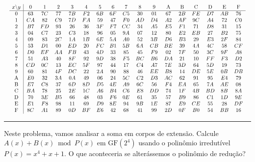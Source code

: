 \documentclass[12pt,a4paper]{article}
\newcommand{\exercicio}[1]{%
    \par\vspace{1.2em}
    \noindent
    {\color{black!55}\rule[-0.25em]{3pt}{1.6em}}%
    \hspace{0.6em}{\Large\bfseries Exerc\'{i}cio #1}
    \par\vspace{-0.4em}
    \noindent{\color{black!35}\rule{\textwidth}{0.4pt}}
    \par\vspace{0.35em}
}
\begin{document}
\begingroup
\setlength{\tabcolsep}{2pt}
\renewcommand{\arraystretch}{0.95}
\scriptsize
\[
\resizebox{\textwidth}{!}{$
\begin{array}{c|cccccccccccccccc}
x \backslash y & 0 & 1 & 2 & 3 & 4 & 5 & 6 & 7 & 8 & 9 & \mathrm{A} & \mathrm{B} & \mathrm{C} & \mathrm{D} & \mathrm{E} & \mathrm{F} \\
\hline
0 & 63 & 7C & 77 & 7B & F2 & 6B & 6F & C5 & 30 & 01 & 67 & 2B & FE & D7 & AB & 76 \\
1 & CA & 82 & C9 & 7D & FA & 59 & 47 & F0 & AD & D4 & A2 & AF & 9C & A4 & 72 & C0 \\
2 & B7 & FD & 93 & 26 & 36 & 3F & F7 & CC & 34 & A5 & E5 & F1 & 71 & D8 & 31 & 15 \\
3 & 04 & C7 & 23 & C3 & 18 & 96 & 05 & 9A & 07 & 12 & 80 & E2 & EB & 27 & B2 & 75 \\
4 & 09 & 83 & 2C & 1A & 1B & 6E & 5A & A0 & 52 & 3B & D6 & B3 & 29 & E3 & 2F & 84 \\
5 & 53 & D1 & 00 & ED & 20 & FC & B1 & 5B & 6A & CB & BE & 39 & 4A & 4C & 58 & CF \\
6 & D0 & EF & AA & FB & 43 & 4D & 33 & 85 & 45 & F9 & 02 & 7F & 50 & 3C & 9F & A8 \\
7 & 51 & A3 & 40 & 8F & 92 & 9D & 38 & F5 & BC & B6 & DA & 21 & 10 & FF & F3 & D2 \\
8 & CD & 0C & 13 & EC & 5F & 97 & 44 & 17 & C4 & A7 & 7E & 3D & 64 & 5D & 19 & 73 \\
9 & 60 & 81 & 4F & DC & 22 & 2A & 90 & 88 & 46 & EE & B8 & 14 & DE & 5E & 0B & DB \\
\mathrm{A} & E0 & 32 & 3A & 0A & 49 & 06 & 24 & 5C & C2 & D3 & AC & 62 & 91 & 95 & E4 & 79 \\
\mathrm{B} & E7 & C8 & 37 & 6D & 8D & D5 & 4E & A9 & 6C & 56 & F4 & EA & 65 & 7A & AE & 08 \\
\mathrm{C} & BA & 78 & 25 & 2E & 1C & A6 & B4 & C6 & E8 & DD & 74 & 1F & 4B & BD & 8B & 8A \\
\mathrm{D} & 70 & 3E & B5 & 66 & 48 & 03 & F6 & 0E & 61 & 35 & 57 & B9 & 86 & C1 & 1D & 9E \\
\mathrm{E} & E1 & F8 & 98 & 11 & 69 & D9 & 8E & 94 & 9B & 1E & 87 & E9 & CE & 55 & 28 & DF \\
\mathrm{F} & 8C & A1 & 89 & 0D & BF & E6 & 42 & 68 & 41 & 99 & 2D & 0F & B0 & 54 & BB & 16
\end{array}
$}
\]
\endgroup

\newpage

\exercicio{1}
Neste problema, vamos analisar a soma em corpos de extens\~{a}o. Calcule $A(x) + B(x) \bmod P(x)$ em $\mathrm{GF}(2^4)$ usando o polin\^{o}mio irredut\'{i}vel $P(x) = x^4 + x + 1$. O que aconteceria se alter\'{a}ssemos o polin\^{o}mio de redu\c{c}\~{a}o?
\end{document}
